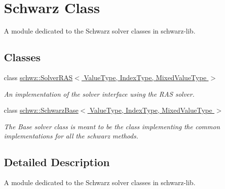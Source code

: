 \hypertarget{group__schwarz__class}{}\section{Schwarz Class}
\label{group__schwarz__class}


A module dedicated to the Schwarz solver classes in schwarz-\/lib.  


\subsection*{Classes}
\begin{DoxyCompactItemize}
\item 
class \hyperlink{classschwz_1_1SolverRAS}{schwz\+::\+Solver\+R\+A\+S$<$ Value\+Type, Index\+Type, Mixed\+Value\+Type $>$}
\begin{DoxyCompactList}\small\item\em An implementation of the solver interface using the R\+AS solver. \end{DoxyCompactList}\item 
class \hyperlink{classschwz_1_1SchwarzBase}{schwz\+::\+Schwarz\+Base$<$ Value\+Type, Index\+Type, Mixed\+Value\+Type $>$}
\begin{DoxyCompactList}\small\item\em The Base solver class is meant to be the class implementing the common implementations for all the schwarz methods. \end{DoxyCompactList}\end{DoxyCompactItemize}


\subsection{Detailed Description}
A module dedicated to the Schwarz solver classes in schwarz-\/lib. 

